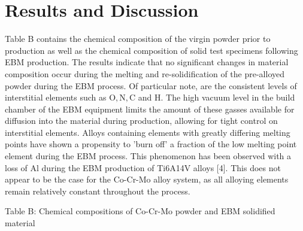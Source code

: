 \documentclass[10pt]{article}
\begin{document}
\section*{Results and Discussion}
Table B contains the chemical composition of the virgin powder prior to production as well as the chemical composition of solid test specimens following EBM production. The results indicate that no significant changes in material composition occur during the melting and re-solidification of the pre-alloyed powder during the EBM process. Of particular note, are the consistent levels of interstitial elements such as $\mathrm{O}, \mathrm{N}, \mathrm{C}$ and $\mathrm{H}$. The high vacuum level in the build chamber of the EBM equipment limits the amount of these gasses available for diffusion into the material during production, allowing for tight control on interstitial elements. Alloys containing elements with greatly differing melting points have shown a propensity to 'burn off' a fraction of the low melting point element during the EBM process. This phenomenon has been observed with a loss of Al during the EBM production of Ti6A14V alloys [4]. This does not\\
appear to be the case for the Co-Cr-Mo alloy system, as all alloying elements remain relatively constant throughout the process.

Table B: Chemical compositions of Co-Cr-Mo powder and EBM solidified material
\end{document}
